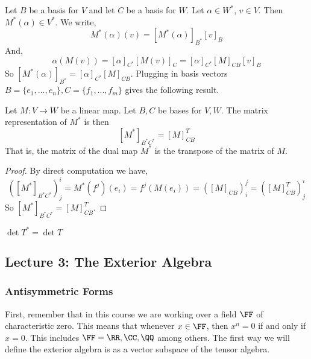 Let $B$ be a basis for $V$ and let $C$ be a basis for $W$. Let $\alpha\in W^*$, $v\in V$. Then $M^*(\alpha) \in V^*$. We write,
\[M^*(\alpha)(v) = [M^*(\alpha)]_{B^*}[v]_B\]
And,
\[\alpha(M(v))=[\alpha]_{C^*}[M(v)]_C = [\alpha]_{C^*}[M]_{CB}[v]_B\]
So $[M^*(\alpha)]_{B^*} = [\alpha]_{C^*}[M]_{CB}$. Plugging in basis vectors $B=\{e_1,...,e_n\},C=\{f_1,...,f_m\}$ gives the following result.
\begin{thm}
Let $M : V \to W$ be a linear map. Let $B,C$ be bases for $V,W$.
The matrix representation of $M^*$ is then 
\[[M^*]_{B^* C^*}  = [M]_{CB}^T\]
That is, the matrix of the dual map $M^*$ is the transpose of the matrix of $M$.
\end{thm}
\begin{proof}By direct computation we have,
\[([M^*]_{B^* C^*})^i_j = M^*(f^j)(e_i) = f^j(M(e_i)) = ([M]_{CB})^j_i = ([M]_{CB}^T)_j^i\]
So $[M^*]_{B^* C^*} = [M]_{CB}^T$.
\end{proof}
\begin{cor}
    $\det T^* = \det T$
\end{cor}

\subsection{Lecture 3: The Exterior Algebra}
\subsubsection{Antisymmetric Forms}
First, remember that in this course we are working over a field $\FF$ of characteristic zero. This means that whenever $x \in \FF$, then $x^n = 0$ if and only if $x=0$. This includes $\FF=\RR,\CC,\QQ$ among others. The first way we will define the exterior algebra is as a vector subspace of the tensor algebra. 

